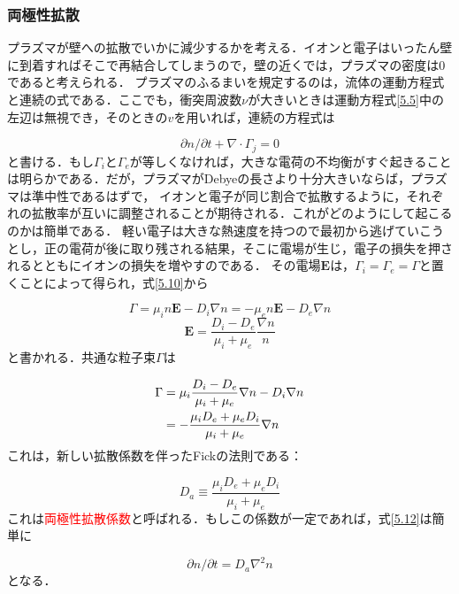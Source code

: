 \documentclass{ltjsarticle}
\numberwithin{equation}{section} %
\begin{document}
\subsubsection{両極性拡散} \label{section5.2.1}
プラズマが壁への拡散でいかに減少するかを考える．イオンと電子はいったん壁に到着すればそこで再結合してしまうので，壁の近くでは，プラズマの密度は0であると考えられる．
プラズマのふるまいを規定するのは，流体の運動方程式と連続の式である．ここでも，衝突周波数$\nu$が大きいときは運動方程式\eqref{5.5}中の左辺は無視でき，そのときの$v$を用いれば，連続の方程式は

\begin{equation}
  \partial n/\partial t + \nabla \cdot \Gamma_j =0 \label{5.12} 
\end{equation}
と書ける．もし$\Gamma_i$と$\Gamma_e$が等しくなければ，大きな電荷の不均衡がすぐ起きることは明らかである．だが，プラズマがDebyeの長さより十分大きいならば，プラズマは準中性であるはずで，
イオンと電子が同じ割合で拡散するように，それぞれの拡散率が互いに調整されることが期待される．これがどのようにして起こるのかは簡単である．
軽い電子は大きな熱速度を持つので最初から逃げていこうとし，正の電荷が後に取り残される結果，そこに電場が生じ，電子の損失を押されるとともにイオンの損失を増やすのである．
その電場$\bm{E}$は，$\Gamma_i=\Gamma_e=\Gamma$と置くことによって得られ，式\eqref{5.10}から

\begin{equation}
  \Gamma = \mu_in\bm{E}-D_i\nabla n = -\mu_en\bm{E} -D_e\nabla n \label{5.13}
\end{equation}
\begin{equation}
  \bm{E} = \frac{D_i-D_e}{\mu_i + \mu_e}\frac{\nabla n}{n} \label{5.14}
\end{equation}
と書かれる．共通な粒子束$\Gamma$は

\begin{align}
  \Gamma &= \mu_i\frac{D_i - D_e}{\mu_i + \mu_e}\nabla n -D_i\nabla n \notag\\
         &= -\frac{\mu_iD_e + \mu_eD_i}{\mu_i + \mu_e}\nabla n \label{5.15}
\end{align}
これは，新しい拡散係数を伴ったFickの法則である：

\begin{equation}
  \boxed{D_a \equiv \frac{\mu_iD_e + \mu_eD_i}{\mu_i +\mu_e}} \label{5.16}
\end{equation}
これは\textcolor{red}{両極性拡散係数}と呼ばれる．もしこの係数が一定であれば，式\eqref{5.12}は簡単に

\begin{equation}
  \partial n/\partial t = D_a\nabla^2 n \label{5.17}
\end{equation}
となる．
\end{document}
